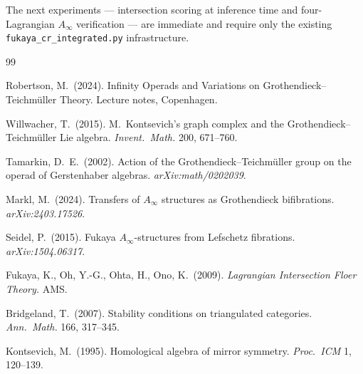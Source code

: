 \documentclass[11pt]{amsart}
\begin{document}
The next experiments --- intersection scoring at inference time
and four-Lagrangian $A_\infty$ verification --- are immediate
and require only the existing \texttt{fukaya\_cr\_integrated.py}
infrastructure.

\begin{thebibliography}{99}

Robertson, M.\ (2024).
Infinity Operads and Variations on Grothendieck--Teichm{\"{u}}ller Theory.
Lecture notes, Copenhagen.

Willwacher, T.\ (2015).
M.\ Kontsevich's graph complex and the Grothendieck--Teichm{\"{u}}ller Lie algebra.
\emph{Invent.\ Math.} 200, 671--760.

Tamarkin, D.~E.\ (2002).
Action of the Grothendieck--Teichm{\"u}ller group on the operad of
Gerstenhaber algebras.
\emph{arXiv:math/0202039}.

Markl, M.\ (2024).
Transfers of $A_\infty$ structures as Grothendieck bifibrations.
\emph{arXiv:2403.17526}.

Seidel, P.\ (2015).
Fukaya $A_\infty$-structures from Lefschetz fibrations.
\emph{arXiv:1504.06317}.

Fukaya, K., Oh, Y.-G., Ohta, H., Ono, K.\ (2009).
\emph{Lagrangian Intersection Floer Theory.}
AMS.

Bridgeland, T.\ (2007).
Stability conditions on triangulated categories.
\emph{Ann.\ Math.} 166, 317--345.

Kontsevich, M.\ (1995).
Homological algebra of mirror symmetry.
\emph{Proc.\ ICM} 1, 120--139.

\end{thebibliography}
\end{document}

